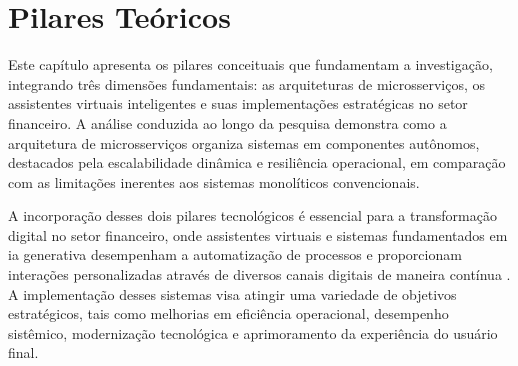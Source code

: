 \chapter{Pilares Teóricos}
\label{ch:2pilares}

Este capítulo apresenta os pilares conceituais que fundamentam a investigação, integrando três dimensões fundamentais: as arquiteturas de microsserviços, os assistentes virtuais inteligentes e suas implementações estratégicas no setor financeiro. A análise conduzida ao longo da pesquisa demonstra como a arquitetura de microsserviços organiza sistemas em componentes autônomos, destacados pela escalabilidade dinâmica e resiliência operacional, em comparação com as limitações inerentes aos sistemas monolíticos convencionais.

A incorporação desses dois pilares tecnológicos é essencial para a transformação digital no setor financeiro, onde assistentes virtuais e sistemas fundamentados em \acrfull{ia} generativa desempenham a automatização de processos e proporcionam interações personalizadas através de diversos canais digitais de maneira contínua \cite{boston_consulting_group_winning_2022}. A implementação desses sistemas visa atingir uma variedade de objetivos estratégicos, tais como melhorias em eficiência operacional, desempenho sistêmico, modernização tecnológica e aprimoramento da experiência do usuário final.



